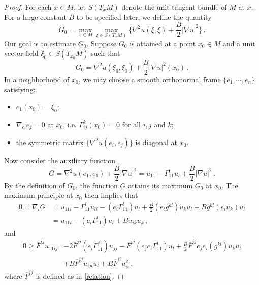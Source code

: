 \documentclass[10pt,a4paper]{amsart}
\begin{document}
\begin{proof}
For each $x\in M$, let $S(T_{x}M)$ denote the unit tangent bundle of $M$ at $x$. For a large constant $B$ to be specified later, we define the quantity
\begin{equation*}
G_{0}=\max_{x\in M}\max_{\xi\in S(T_{x}M)}\bigg\{\nabla^2 u(\xi,\xi)+\frac{B}{2}|\nabla u|^{2}\bigg\}\,.
\end{equation*}
Our goal is to estimate $G_0$. Suppose $G_0$ is attained at a point $x_0 \in M$ and a unit vector field $\xi_0 \in S(T_{x_0} M)$ such that
\[
G_{0}=\nabla^2 u(\xi_{0},\xi_{0})+\frac{B}{2}|\nabla u|^{2}(x_{0})\,.
\]
In a neighborhood of $x_0$, we may choose a smooth orthonormal frame $\{e_1, \cdots, e_n\}$ satisfying:
\begin{itemize}\itemsep0.5em
\item[(i)] $e_{1}(x_0)=\xi_{0}$;
\item[(ii)] $\nabla_{e_i}e_j=0$ at $x_0$, i.e. $\Gamma_{ij}^k(x_0)=0$ for all $i,j$ and $k$;
\item[(iii)] the symmetric matrix $\{\nabla^2u(e_{i},e_{j})\}$ is diagonal at $x_0$.
\end{itemize}

Now consider the auxiliary function
\[
G=\nabla^2u(e_1,e_1)+\frac{B}{2}|\nabla u|^2=u_{11}-\Gamma_{11}^{l}u_{l}+\frac{B}{2}|\nabla u|^2\,.
\]
By the definition of $G_0$, the function $G$ attains its maximum $G_0$ at $x_0$.
The maximum principle  at $x_0$ then implies that
\begin{equation}\label{vanishes 1}
\begin{split}
0=\nabla_{i}G &= u_{11i}-\Gamma_{11}^{l}u_{li}-(e_{i}\Gamma_{11}^{l})u_{l}+\frac{B}{2}(e_{i}g^{kl})u_{k}u_{l}+Bg^{kl}(e_{i}u_{k})u_{l}\\
&=u_{11i}-(e_{i}\Gamma_{11}^{l})u_{l}+Bu_{ik}u_{k}\,,
\end{split}
\end{equation}
and
\begin{equation}\label{max principle}
\begin{split}
0\geq \overline{F}^{ij} u_{11ij}&-2\overline{F}^{ij}(e_{i}\Gamma_{11}^{j})u_{jj}-\overline{F}^{ij}(e_{j}e_{i}\Gamma_{11}^{l})u_{l}+\frac{B}{2}\overline{F}^{ij}e_{j}e_{i}(g^{kl})u_{k}u_{l}\\&+B\overline{F}^{ij}u_{ijl}u_{l}+B\overline{F}^{ii}u_{ii}^{2}\,,
\end{split}
\end{equation}
where ${\overline{F}^{ij}}$ is defined as in \eqref{relation}.


\end{proof}
\end{document}
